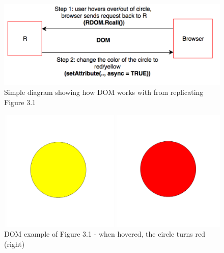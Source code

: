 \documentclass[11pt,]{report}
\begin{document}
\begin{figure}[H]

{\centering \includegraphics[width=0.7\linewidth,]{./fig/circle-DOM-diagram} 

}

\caption{\label{fig:circle-DOM-diagram} Simple diagram showing how DOM works with from replicating Figure 3.1}\label{fig:unnamed-chunk-41}
\end{figure}

\begin{figure}[H]

{\centering \includegraphics[width=0.7\linewidth,]{./fig/circle-DOM-1} 

}

\caption{\label{fig:circle-DOM-1} DOM example of Figure 3.1 - when hovered, the circle turns red (right)}\label{fig:unnamed-chunk-42}
\end{figure}
\end{document}
